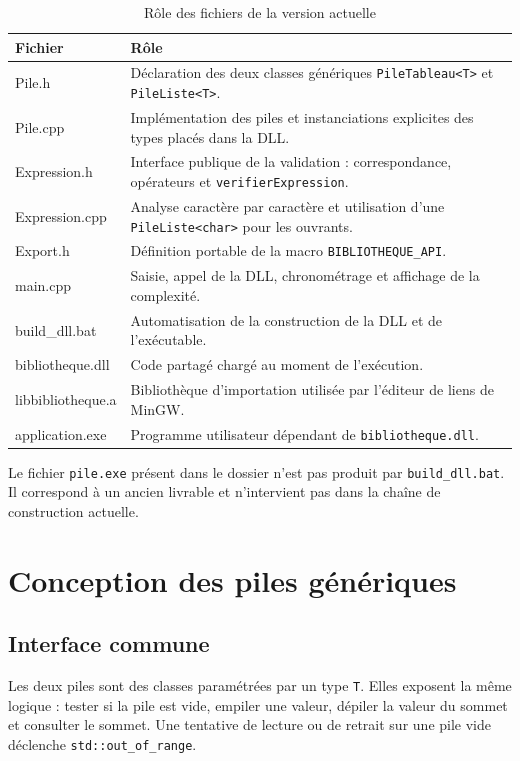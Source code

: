 \documentclass[11pt,a4paper]{article}
\newcommand{\fichier}[1]{\texttt{#1}}
\begin{document}
\begin{table}[ht]
\centering
\caption{Rôle des fichiers de la version actuelle}
\begin{tabularx}{\textwidth}{>{\ttfamily}p{3.4cm} X}
\toprule
\normalfont\textbf{Fichier} & \textbf{Rôle} \\
\midrule
Pile.h & Déclaration des deux classes génériques \texttt{PileTableau<T>} et \texttt{PileListe<T>}. \\
Pile.cpp & Implémentation des piles et instanciations explicites des types placés dans la DLL. \\
Expression.h & Interface publique de la validation : correspondance, opérateurs et \texttt{verifierExpression}. \\
Expression.cpp & Analyse caractère par caractère et utilisation d'une \texttt{PileListe<char>} pour les ouvrants. \\
Export.h & Définition portable de la macro \texttt{BIBLIOTHEQUE\_API}. \\
main.cpp & Saisie, appel de la DLL, chronométrage et affichage de la complexité. \\
build\_dll.bat & Automatisation de la construction de la DLL et de l'exécutable. \\
bibliotheque.dll & Code partagé chargé au moment de l'exécution. \\
libbibliotheque.a & Bibliothèque d'importation utilisée par l'éditeur de liens de MinGW. \\
application.exe & Programme utilisateur dépendant de \texttt{bibliotheque.dll}. \\
\bottomrule
\end{tabularx}
\end{table}

Le fichier \fichier{pile.exe} présent dans le dossier n'est pas produit par \fichier{build\_dll.bat}. Il correspond à un ancien livrable et n'intervient pas dans la chaîne de construction actuelle.

\section{Conception des piles génériques}

\subsection{Interface commune}

Les deux piles sont des classes paramétrées par un type \texttt{T}. Elles exposent la même logique : tester si la pile est vide, empiler une valeur, dépiler la valeur du sommet et consulter le sommet. Une tentative de lecture ou de retrait sur une pile vide déclenche \texttt{std::out\_of\_range}.
\end{document}
